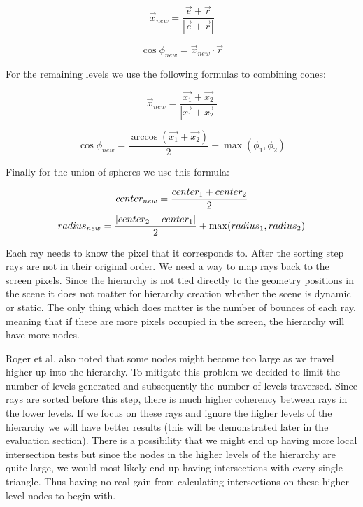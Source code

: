 \begin{equation}
    \vec{x}_{new} = \frac{ \vec{e} + \vec{r} }
                         {|\vec{e} + \vec{r}|}
\end{equation}

\begin{equation}
    \cos{\phi_{new}} = \vec{x}_{new} \cdot \vec{r}
\end{equation}

For the remaining levels we use the following formulas to combining cones:

\begin{equation}
    \vec{x}_{new} = \frac{ \vec{x_{1}} + \vec{x_{2}} }
                         {|\vec{x_{1}} + \vec{x_{2}}|}
\end{equation}

\begin{equation}        
    \cos{\phi_{new}} = \frac{\arccos(\vec{x_{1}} + \vec{x_{2}})}{2} + \max(\phi_{1}, \phi_{2})
\end{equation}

Finally for the union of spheres we use this formula:

\begin{equation}
center_{new} = \frac{center_{1} + center_{2}}{2}\\
\end{equation}
\begin{equation}
radius_{new} = \frac{|center_{2} - center_{1}|}{2} + \max(radius_{1},radius_{2})\\
\end{equation}
    
Each ray needs to know the pixel that it corresponds to. After the sorting step rays are not in their original order. We need a way to map rays back to the screen pixels. Since the hierarchy is not tied directly to the geometry positions in the scene it does not matter for hierarchy creation whether the scene is dynamic or static. The only thing which does matter is the number of bounces of each ray, meaning that if there are more pixels occupied in the screen, the hierarchy will have more nodes.

\medskip

Roger et al. \cite{Roger07} also noted that some nodes might become too large as we travel higher up into the hierarchy. To mitigate this problem we decided to limit the number of levels generated and subsequently the number of levels traversed. Since rays are sorted before this step, there is much higher coherency between rays in the lower levels. If we focus on these rays and ignore the higher levels of the hierarchy we will have better results (this will be demonstrated later in the evaluation section). There is a possibility that we might end up having more local intersection tests but since the nodes in the higher levels of the hierarchy are quite large, we would most likely end up having intersections with every single triangle. Thus having no real gain from calculating intersections on these higher level nodes to begin with.

